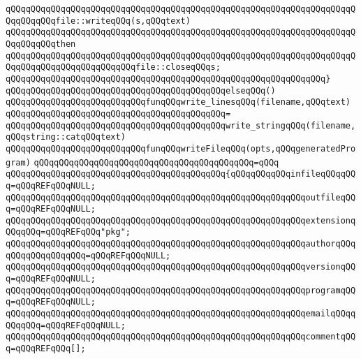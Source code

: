 \newline
\verb|qQQqqQQqqQQqqQQqqQQqqQQqqQQqqQQqqQQqqQQqqQQqqQQqqQQqqQQqqQQqqQQqqQQqqQQqqQQqqQQqfile::writeqQQq(s,qQQqtext)|\newline
\verb|qQQqqQQqqQQqqQQqqQQqqQQqqQQqqQQqqQQqqQQqqQQqqQQqqQQqqQQqqQQqqQQqqQQqqQQqqQQqqQQqthen|\newline
\verb|qQQqqQQqqQQqqQQqqQQqqQQqqQQqqQQqqQQqqQQqqQQqqQQqqQQqqQQqqQQqqQQqqQQqqQQqqQQqqQQqqQQqqQQqqQQqqQQqfile::closeqQQqs;|\newline
\verb|qQQqqQQqqQQqqQQqqQQqqQQqqQQqqQQqqQQqqQQqqQQqqQQqqQQqqQQqqQQqqQQq}|\newline
\verb|qQQqqQQqqQQqqQQqqQQqqQQqqQQqqQQqqQQqqQQqqQQqelseqQQq()|\newline
\newline
\verb|qQQqqQQqqQQqqQQqqQQqqQQqqQQqfunqQQqwrite_linesqQQq(filename,qQQqtext)|\newline
\verb|qQQqqQQqqQQqqQQqqQQqqQQqqQQqqQQqqQQqqQQqqQQq=|\newline
\verb|qQQqqQQqqQQqqQQqqQQqqQQqqQQqqQQqqQQqqQQqqQQqwrite_stringqQQq(filename,qQQqstring::catqQQqtext)|\newline
\newline
\verb|qQQqqQQqqQQqqQQqqQQqqQQqqQQqfunqQQqwriteFileqQQq(opts,qQQqgeneratedProgram)|\newline
\verb|qQQqqQQqqQQqqQQqqQQqqQQqqQQqqQQqqQQqqQQqqQQq=qQQq|\newline
\verb|qQQqqQQqqQQqqQQqqQQqqQQqqQQqqQQqqQQqqQQqqQQq{qQQqqQQqqQQqinfileqQQqqQQq=qQQqREFqQQqNULL;|\newline
\verb|qQQqqQQqqQQqqQQqqQQqqQQqqQQqqQQqqQQqqQQqqQQqqQQqqQQqqQQqqQQqoutfileqQQq=qQQqREFqQQqNULL;|\newline
\verb|qQQqqQQqqQQqqQQqqQQqqQQqqQQqqQQqqQQqqQQqqQQqqQQqqQQqqQQqqQQqextensionqQQqqQQq=qQQqREFqQQq"pkg";|\newline
\verb|qQQqqQQqqQQqqQQqqQQqqQQqqQQqqQQqqQQqqQQqqQQqqQQqqQQqqQQqqQQqauthorqQQqqQQqqQQqqQQqqQQq=qQQqREFqQQqNULL;|\newline
\verb|qQQqqQQqqQQqqQQqqQQqqQQqqQQqqQQqqQQqqQQqqQQqqQQqqQQqqQQqqQQqversionqQQq=qQQqREFqQQqNULL;|\newline
\verb|qQQqqQQqqQQqqQQqqQQqqQQqqQQqqQQqqQQqqQQqqQQqqQQqqQQqqQQqqQQqprogramqQQq=qQQqREFqQQqNULL;|\newline
\verb|qQQqqQQqqQQqqQQqqQQqqQQqqQQqqQQqqQQqqQQqqQQqqQQqqQQqqQQqqQQqemailqQQqqQQqqQQq=qQQqREFqQQqNULL;|\newline
\verb|qQQqqQQqqQQqqQQqqQQqqQQqqQQqqQQqqQQqqQQqqQQqqQQqqQQqqQQqqQQqcommentqQQq=qQQqREFqQQq[];|\newline
